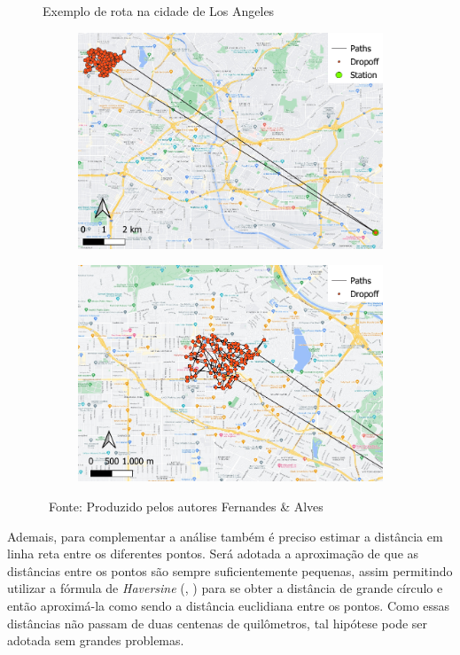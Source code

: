 \begin{figure}[htbp]
     \caption{Exemplo de rota na cidade de Los Angeles}
     \begin{subfigure}{.49\textwidth}
         \centering
         \includegraphics[height=0.63\textwidth]{images/4_materiais/lmr_analyzer/cf_LA_example_zoom.pdf}
     \end{subfigure}
     \begin{subfigure}{.49\textwidth}
       \centering
       \includegraphics[height=0.63\textwidth]{images/4_materiais/lmr_analyzer/cf_LA_example_zoom_in.pdf}
     \end{subfigure}
     \caption*{\ Fonte: Produzido pelos autores Fernandes \& Alves}
     \label{fig:rota_LA_CF}
 \end{figure} %

Ademais, para complementar a análise também é preciso estimar a distância em linha reta entre os diferentes pontos.
%
Será adotada a aproximação de que as distâncias entre os pontos são sempre suficientemente pequenas, assim permitindo utilizar a fórmula de \textit{Haversine} (, \citeyear{robusto1957cosine}) para se obter a distância de grande círculo e então aproximá-la como sendo a distância euclidiana entre os pontos.
%
Como essas distâncias não passam de duas centenas de quilômetros, tal hipótese pode ser adotada sem grandes problemas.

